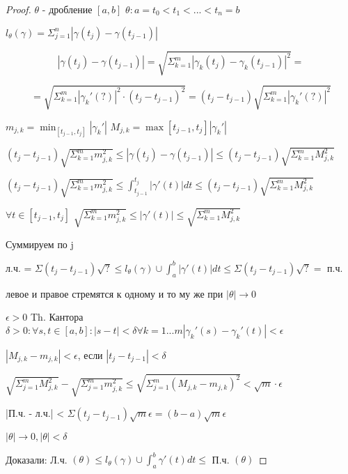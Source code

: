 \begin{proof}
    $\theta $ - дробление $[a, b]$ $\theta : a = t_0 < t_1 < ... < t_n = b$

    $l_\theta(\gamma) = \Sigma_{j = 1}^n |\gamma(t_j) - \gamma(t_{j - 1})|$

    $$|\gamma(t_j) - \gamma(t_{j - 1})| = \sqrt{\Sigma_{k = 1}^ m |\gamma_k(t_j) - \gamma_k(t_{j - 1})| ^ 2} = $$ 
    
    $$ = \sqrt{\Sigma_{k = 1} ^ m |\gamma_k'(?)| ^ 2 \cdot (t_j - t_{j - 1}) ^ 2} = (t_j - t_{j - 1}) \sqrt{\Sigma_{k = 1} ^ m |\gamma_k'(?)|^2}$$

    $m_{j, k} = \min_{[t_{j-1}, t_j]} |\gamma_k'|$
    $M_{j, k} = \max{[t_{j-1}, t_j]} |\gamma_k'|$


    $(t_j - t_{j - 1}) \sqrt{\Sigma_{k = 1} ^ m m_{j, k}^2} \leqslant |\gamma(t_j) - \gamma(t_{j - 1})| \leqslant (t_j - t_{j - 1}) \sqrt{\Sigma_{k = 1} ^ m M_{j, k}^2}$

    $(t_j - t_{j - 1}) \sqrt{\Sigma_{k = 1} ^ m m_{j, k}^2} \leqslant \int_{t_{j - 1}}^{t_j} | \gamma'(t)| dt \leqslant (t_j - t_{j - 1}) \sqrt{\Sigma_{k = 1} ^ m M_{j, k}^2} $

    $\forall t \in [t_{j - 1}, t_j]$ $\sqrt{\Sigma_{k = 1} ^ m m_{j, k}^2} \leqslant |\gamma'(t)| \leqslant \sqrt{\Sigma_{k = 1} ^ m M_{j, k}^2} $

    Суммируем по j 

    л.ч. = $\Sigma (t_j - t_{j - 1}) \sqrt{?} \leqslant l_{\theta}(\gamma) \cup  \int_{a}^{b} | \gamma'(t)| dt \leqslant \Sigma (t_j - t_{j - 1}) \sqrt{?} = $ п.ч. 

    левое и правое стремятся к одному и то му же при $|\theta| \to 0$


    $\epsilon > 0$ Th. Кантора $\delta > 0 : \forall s, t \in [a, b] : |s - t| < \delta \forall k = 1...m |\gamma_k'(s) - \gamma_k'(t)| < \epsilon$

    $|M_{j, k} - m_{j, k}| < \epsilon$, если $|t_j - t_{j - 1}| < \delta$

    $\sqrt{\Sigma_{j = 1}^m M_{j, k}^ 2} - \sqrt{\Sigma_{j = 1}^m m_{j, k}^ 2} \leqslant \sqrt{\Sigma_{j = 1}^m (M_{j, k} - m_{j, k})^ 2} < \sqrt{m} \cdot \epsilon$

    |П.ч. - л.ч.| < $\Sigma (t_j - t_{j - 1}) \sqrt{m} \epsilon = (b - a) \sqrt{m} \epsilon$
    
    $|\theta| \to 0, |\theta| < \delta$

    Доказали: Л.ч. $(\theta) \leqslant l_\theta(\gamma) \cup \int_a^b \gamma'(t) dt \leqslant$ П.ч. $(\theta)$
\end{proof}

